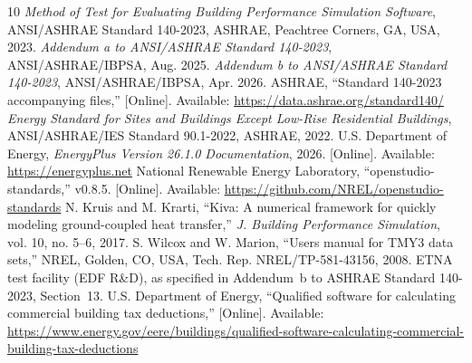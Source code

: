 \documentclass[conference,10pt]{IEEEtran}
\begin{document}
\begin{thebibliography}{10}
 \emph{Method of Test for Evaluating Building Performance Simulation Software}, ANSI/ASHRAE Standard 140-2023, ASHRAE, Peachtree Corners, GA, USA, 2023.
 \emph{Addendum a to ANSI/ASHRAE Standard 140-2023}, ANSI/ASHRAE/IBPSA, Aug. 2025.
 \emph{Addendum b to ANSI/ASHRAE Standard 140-2023}, ANSI/ASHRAE/IBPSA, Apr. 2026.
 ASHRAE, ``Standard 140-2023 accompanying files,'' [Online]. Available: \url{https://data.ashrae.org/standard140/}
 \emph{Energy Standard for Sites and Buildings Except Low-Rise Residential Buildings}, ANSI/ASHRAE/IES Standard 90.1-2022, ASHRAE, 2022.
 U.S. Department of Energy, \emph{EnergyPlus Version 26.1.0 Documentation}, 2026. [Online]. Available: \url{https://energyplus.net}
 National Renewable Energy Laboratory, ``openstudio-standards,'' v0.8.5. [Online]. Available: \url{https://github.com/NREL/openstudio-standards}
 N. Kruis and M. Krarti, ``Kiva\texttrademark: A numerical framework for quickly modeling ground-coupled heat transfer,'' \emph{J. Building Performance Simulation}, vol. 10, no. 5--6, 2017.
 S. Wilcox and W. Marion, ``Users manual for TMY3 data sets,'' NREL, Golden, CO, USA, Tech. Rep. NREL/TP-581-43156, 2008.
 ETNA test facility (EDF R\&D), as specified in Addendum~b to ASHRAE Standard 140-2023, Section~13.
 U.S. Department of Energy, ``Qualified software for calculating commercial building tax deductions,'' [Online]. Available: \url{https://www.energy.gov/eere/buildings/qualified-software-calculating-commercial-building-tax-deductions}
\end{thebibliography}
\end{document}
